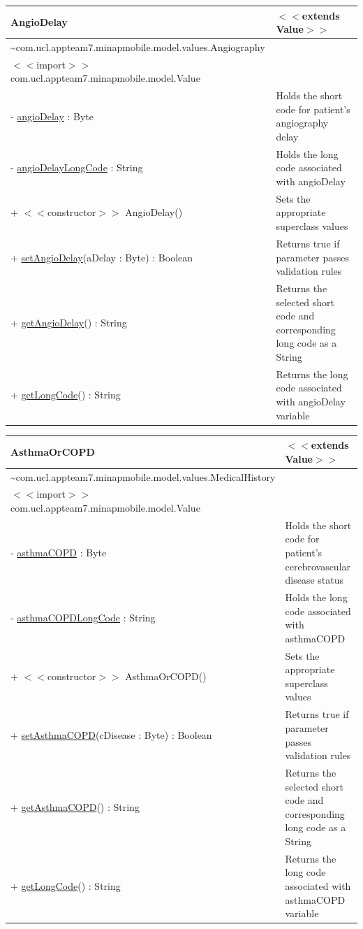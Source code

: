 \documentclass[12pt,a4paper,oneside,titlepage]{article}
\begin{document}
\begin{center}
	\begin{tabular}{| p{13cm} | p{5cm} |}
	\hline
	\textbf{AngioDelay} & \textbf{$<<$extends Value$>>$} \\ \hline
	\textasciitilde com.ucl.appteam7.minapmobile.model.values.Angiography & \\ \hline
	$<<$import$>>$ com.ucl.appteam7.minapmobile.model.Value & \\ \hline \hline
	- \underline{angioDelay} : Byte & Holds the short code for patient's angiography delay \\ \hline
	- \underline{angioDelayLongCode} : String & Holds the long code associated with angioDelay \\ \hline \hline
	+ $<<$constructor$>>$ AngioDelay() & Sets the appropriate superclass values \\ \hline
	+ \underline{setAngioDelay}(aDelay : Byte) : Boolean & Returns true if parameter passes validation rules \\ \hline
	+ \underline{getAngioDelay}() : String & Returns the selected short code and corresponding long code as a String \\ \hline
	+ \underline{getLongCode}() : String & Returns the long code associated with angioDelay variable \\ \hline
	\end{tabular}
\end{center}

\begin{center}
	\begin{tabular}{| p{13cm} | p{5cm} |}
	\hline
	\textbf{AsthmaOrCOPD} & \textbf{$<<$extends Value$>>$} \\ \hline
	\textasciitilde com.ucl.appteam7.minapmobile.model.values.MedicalHistory & \\ \hline
	$<<$import$>>$ com.ucl.appteam7.minapmobile.model.Value & \\ \hline \hline
	- \underline{asthmaCOPD} : Byte & Holds the short code for patient's cerebrovascular disease status \\ \hline
	- \underline{asthmaCOPDLongCode} : String & Holds the long code associated with asthmaCOPD \\ \hline \hline
	+ $<<$constructor$>>$ AsthmaOrCOPD() & Sets the appropriate superclass values \\ \hline
	+ \underline{setAsthmaCOPD}(cDisease : Byte) : Boolean & Returns true if parameter passes validation rules \\ \hline
	+ \underline{getAsthmaCOPD}() : String & Returns the selected short code and corresponding long code as a String \\ \hline
	+ \underline{getLongCode}() : String & Returns the long code associated with asthmaCOPD variable \\ \hline
	\end{tabular}
\end{center}
\end{document}
